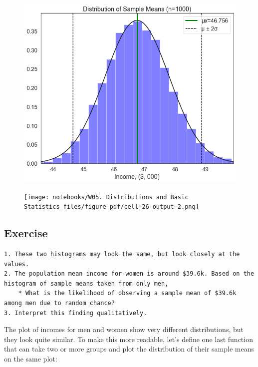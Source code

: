 \documentclass[
  letterpaper,
  DIV=11,
  numbers=noendperiod]{scrreprt}
\begin{document}
\begin{figure}[H]

{\centering \includegraphics{notebooks/W05. Distributions and Basic Statistics_files/figure-pdf/cell-26-output-1.png}

}

\end{figure}

\begin{figure}[H]

{\centering \texttt{[image: notebooks/W05. Distributions and Basic Statistics\_files/figure-pdf/cell-26-output-2.png]}

}

\end{figure}

\hypertarget{exercise-16}{%
\subsection{Exercise}\label{exercise-16}}

\begin{verbatim}
1. These two histograms may look the same, but look closely at the values. 
2. The population mean income for women is around $39.6k. Based on the histogram of sample means taken from only men, 
    * What is the likelihood of observing a sample mean of $39.6k among men due to random chance?
3. Interpret this finding qualitatively.
\end{verbatim}

The plot of incomes for men and women show very different distributions,
but they look quite similar. To make this more readable, let's define
one last function that can take two or more groups and plot the
distribution of their sample means on the same plot:
\end{document}
